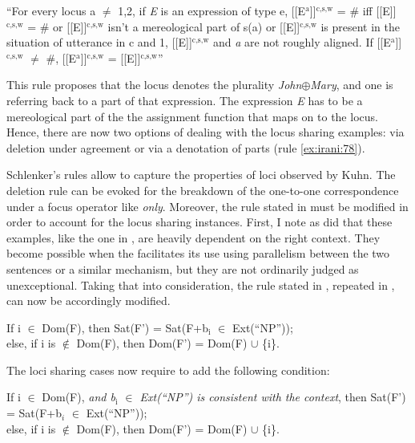 \documentclass[output=paper,
modfonts
]{langscibook}
\begin{document}
\begin{exe}
	\ex \label{ex:irani:78} ``For every locus a \(\neq\) 1,2, if \textit{E} is an expression of type e, {[}[E$^\text{a}$]{]}$^\text{{c,s,w}}$ = \# iff {[}[E]{]}$^\text{{c,s,w}}$ =  \# or {[}[E]{]}$^\text{{c,s,w}}$ isn't a mereological part of s(a) or {[}[E]{]}$^\text{{c,s,w}}$ is present in the situation of utterance in c and 1, {[}[E]{]}$^\text{{c,s,w}}$ and \textit{a} are not roughly aligned. If {[}[E$^\text{a}$]{]}$^\text{{c,s,w}}$ \(\neq\) \#, {[}[E$^\text{a}$]{]}$^\text{{c,s,w}}$ = {[}[E]{]}$^\text{{c,s,w}}$'' \citep[1080]{Schlenker2014}
\end{exe}

This rule proposes that the locus denotes the plurality \textit{John}\(\oplus\)\textit{Mary}, and one is referring back to a part of that expression. The expression \textit{E} has to be a mereological part of the the assignment function that maps on to the locus. Hence, there are now two options of dealing with the locus sharing examples: via deletion under agreement  or via a denotation of parts (rule \ref{ex:irani:78}). 

Schlenker's rules allow to capture the properties of loci observed by Kuhn. The deletion rule can be evoked for the breakdown of the one-to-one correspondence under a focus operator like \textit{only}. Moreover, the rule stated in  must be modified in order to account for the locus sharing instances. First, I note as \citeauthor{Kuhn2015} did that these examples, like the one in , are heavily dependent on the right context. They become possible when the  facilitates its use using parallelism between the two sentences or a similar mechanism, but they are not ordinarily judged as unexceptional. Taking that into consideration, the rule stated in , repeated in , can now be accordingly modified. 

\begin{exe}
	\ex \label{ex:irani:79} If i \(\in\) Dom(F), then Sat(F') = Sat(F+b$_\text{i}$ \(\in\) Ext(``NP''));\\ else, if i is \(\notin\) Dom(F), then Dom(F') = Dom(F) \(\cup\) \{i\}. 
\end{exe}

The loci sharing cases now require to add the following condition: 

\begin{exe}
	\ex \label{ex:irani:80} If i \(\in\) Dom(F), \textit{and b$_\text{i}$ \(\in\) Ext(``NP'') is consistent with the context}, then Sat(F') = Sat(F+b$_i$ \(\in\) Ext(``NP''));\\ 
	else, if i is \(\notin\) Dom(F), then Dom(F') = Dom(F) \(\cup\) \{i\}. \par  
\end{exe}
\end{document}
